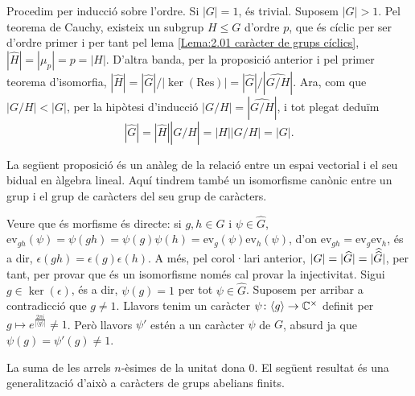 \begin{pf}
    Procedim per inducció sobre l'ordre. Si $|G| = 1$, és trivial. Suposem $|G| > 1$. Pel teorema de Cauchy, existeix un subgrup $H \leq G$ d'ordre $p$, que és cíclic per ser d'ordre primer i per tant pel lema \ref{Lema:2.01 caràcter de grups cíclics}, $|\widehat{H}| = |\mu_p| = p = |H|$. D'altra banda, per la  proposició anterior i pel primer teorema d'isomorfia, $|\widehat{H}| = |\widehat{G}|/|\ker(\mathrm{Res})| = |\widehat{G}|/|\widehat{G/H}|$. Ara, com que $|G/H| < |G|$, per la hipòtesi d'inducció $|G/H| = |\widehat{G/H}|$, i tot plegat deduïm
    \[
    |\widehat{G}|= |\widehat{H}| |\widehat{G/H}| = |H||G/H| = |G|.
    \]
\end{pf}
La següent proposició és un anàleg de la relació entre un espai vectorial i el seu bidual en àlgebra lineal. Aquí tindrem també un isomorfisme canònic entre 
un grup i el grup de caràcters del seu grup de caràcters. 
\begin{pf}
    Veure que és morfisme és directe: si $g, h \in G$ i $\psi \in \widehat{G}$, $\mathrm{ev}_{gh}(\psi) = \psi(gh) = \psi(g)\psi(h) = \mathrm{ev}_g(\psi) \mathrm{ev}_h(\psi)$, d'on $\mathrm{ev}_{gh} = \mathrm{ev}_g \mathrm{ev}_h$, és a dir, $\epsilon (gh) = \epsilon(g)\epsilon(h)$. A més, pel corol·lari anterior, $|G| = |\widehat{G}| = |\skew{3}\widehat{\widehat{G}}|$, per tant, per provar que és un isomorfisme només cal provar la injectivitat. Sigui $g \in \ker(\epsilon)$, és a dir, $\psi(g) = 1$ per tot $\psi \in \widehat{G}$. Suposem per arribar a contradicció que $g \neq 1$. Llavors tenim un caràcter $\psi \colon \langle g \rangle \to \mathbb C^\times$ definit per $g \mapsto e^{\frac{2\pi i}{|\langle g\rangle|}} \neq 1$. Però llavors $\psi'$ estén a un caràcter $\psi$ de $G$, absurd ja que $\psi(g) = \psi'(g) \neq 1$.
\end{pf}

La suma de les arrels $n$-èsimes de la unitat dona 0. El següent resultat és una generalització d'això a caràcters de grups abelians finits.

